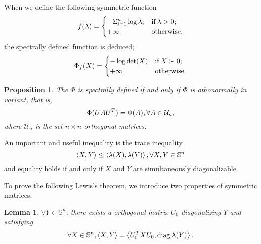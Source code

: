 \documentclass[a4paper,11pt, oneside]{book}
\newtheorem{prop}[thm]{Proposition}
\newtheorem{lem}[thm]{Lemma}
\theoremstyle{definition}
\newcommand{\NDemenstionalRealSymmetricMatrixSpace}{\mathbb{S}^n}
\newcommand{\NDemenstionalRealOthonormalMatrixSpace}{\mathcal{U}_n}
\newcommand{\Diagnosis}[1]{\text{\rm diag\:${#1}$}} %
\newcommand{\InnerProduct}[2]{\left\langle {#1},{#2}\right\rangle} %
\begin{document}
When we define the following symmetric function
\begin{equation}
  f(\lambda)=
    \begin{cases}
      - \Sigma_{i = 1}^{n} \log \lambda_i & \text{\rm if}\:\lambda > 0; \\
      +\infty & \text{\rm otherwise}, \notag
    \end{cases}
\end{equation}
the spectrally defined function is deduced;
\begin{equation}
  \Phi_{f}(X)=
    \begin{cases}
      - \log \det (X) & \text{\rm if}\:X \succ 0; \\
      +\infty & \text{\rm otherwise}. \notag
    \end{cases}
\end{equation}

\begin{prop}
  The $\Phi$ is spectrally defined if and only if $\Phi$ is othonormally in variant, that is,
  \begin{equation}
    \Phi (UAU^T) = \Phi (A), \forall A \in \NDemenstionalRealOthonormalMatrixSpace, \notag
  \end{equation}
  where $\NDemenstionalRealOthonormalMatrixSpace$ is the set $n \times n$ orthogonal matrices.
\end{prop}

An important and useful inequality is the trace inequality
\begin{equation}
  \InnerProduct{X}{Y} \leq \InnerProduct{\lambda(X)}{\lambda(Y)}, \forall X,Y \in \NDemenstionalRealSymmetricMatrixSpace  \notag
\end{equation}
and equality holds if and only if $X$ and $Y$ are simultaneously diagonalizable.

To prove the following Lewis's theorem, we introduce two properties of symmetric matrices.

\begin{lem}\label{lemma1ForLewis96}
  $\forall Y \in \NDemenstionalRealSymmetricMatrixSpace$, there exists a orthogonal matrix $U_0$ diagonalizing $Y$ and satisfying
  \begin{equation}
    \forall X \in \NDemenstionalRealSymmetricMatrixSpace, \InnerProduct{X}{Y} = \InnerProduct{U_0^TXU_0}{\Diagnosis{\lambda (Y)}}. \notag
  \end{equation}
\end{lem}
\end{document}

